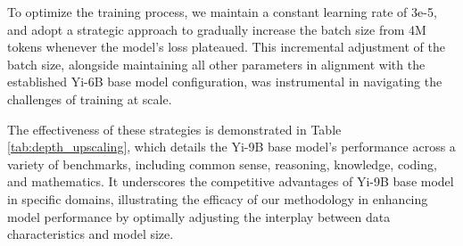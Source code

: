 To optimize the training process, we maintain a constant learning rate of 3e-5, and adopt a strategic approach to gradually increase the batch size from 4M tokens whenever the model's loss plateaued. This incremental adjustment of the batch size, alongside maintaining all other parameters in alignment with the established Yi-6B base model configuration, was instrumental in navigating the challenges of training at scale.

The effectiveness of these strategies is demonstrated in Table \ref{tab:depth_upscaling}, which details the Yi-9B base model's performance across a variety of benchmarks, including common sense, reasoning, knowledge, coding, and mathematics. It underscores the competitive advantages of Yi-9B base model in specific domains, illustrating the efficacy of our methodology in enhancing model performance by optimally adjusting the interplay between data characteristics and model size.


